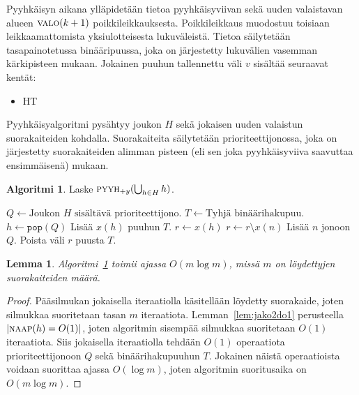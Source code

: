 \documentclass[finnish]{tktltiki2}
\newtheorem{lem}[lau]{Lemma}
\theoremstyle{definition}
\newtheorem{alg}[lau]{Algoritmi}
\theoremstyle{remark}
\newcommand\size[1]{\ensuremath{\left |#1\right |}\xspace}
\newcommand\reach[1]{\ensuremath{\textsc{valo}(#1)}\xspace}
\newcommand\xrange[1]{\ensuremath{x(#1)}\xspace}
\newcommand\nbs[1]{\ensuremath{\textsc{naap}{(#1)}}\xspace}
\newcommand\nbsd[2]{\ensuremath{\textsc{naap}_{#2}{(#1)}}\xspace}
\newcommand\sweep[2]{\ensuremath{\textsc{pyyh}_{#2}{(#1)}}\xspace}
\begin{document}
Pyyhkäisyn aikana ylläpidetään tietoa pyyhkäisyviivan sekä uuden valaistavan alueen \reach{k+1} poikkileikkauksesta.
Poikkileikkaus muodostuu toisiaan leikkaamattomista yksiulotteisesta lukuväleistä.
Tietoa säilytetään tasapainotetussa binääripuussa, joka on järjestetty lukuvälien vasemman kärkipisteen mukaan.
Jokainen puuhun tallennettu väli $v$ sisältää seuraavat kentät:
\begin{itemize}
\item HT
\end{itemize}

Pyyhkäisyalgoritmi pysähtyy joukon $H$ sekä jokaisen uuden valaistun suorakaiteiden kohdalla.
Suorakaiteita säilytetään prioriteettijonossa, joka on järjestetty suorakaiteiden alimman pisteen (eli sen joka pyyhkäisyviiva saavuttaa ensimmäisenä) mukaan.

\begin{alg}\label{alg:light2d}
Laske $\sweep{\bigcup_{h\in H}h}{+y}$.
\begin{algorithmic}
\State $Q\gets\text{Joukon $H$ sisältävä prioriteettijono}$.
\State $T\gets\text{Tyhjä binäärihakupuu}$.
	\State $h\gets \texttt{pop}(Q)$
		\State Lisää \xrange{h} puuhun $T$.
	\EndIf
	\State $r\gets\xrange{h}$
	\ForAll{$n\in\nbsd{h}{+y}$}
		\State $r\gets r\setminus\xrange{n}$
		\If{$\xrange{n}\cap T\neq\emptyset$}
				\State Lisää $n$ jonoon $Q$.
			\EndIf
		\EndIf
	\EndFor
	\State Poista väli $r$ puusta $T$.
\EndWhile
\end{algorithmic}
\end{alg}

\begin{lem}\label{lem:light2dtime}Algoritmi~\ref{alg:light2d} toimii ajassa $O(m\log m)$, missä $m$ on löydettyjen suorakaiteiden määrä.\end{lem}
\begin{proof}
Pääsilmukan jokaisella iteraatiolla käsitellään löydetty suorakaide, joten silmukkaa suoritetaan tasan $m$ iteraatiota.
Lemman~\ref{lem:jako2do1} perusteella $\size{\nbs{h}=O(1)}$, joten algoritmin sisempää silmukkaa suoritetaan $O(1)$ iteraatiota.
Siis jokaisella iteraatiolla tehdään $O(1)$ operaatiota prioriteettijonoon $Q$ sekä binäärihakupuuhun $T$.
Jokainen näistä operaatioista voidaan suorittaa ajassa $O(\log m)$, joten algoritmin suoritusaika on $O(m\log m)$.
\end{proof}
\end{document}
